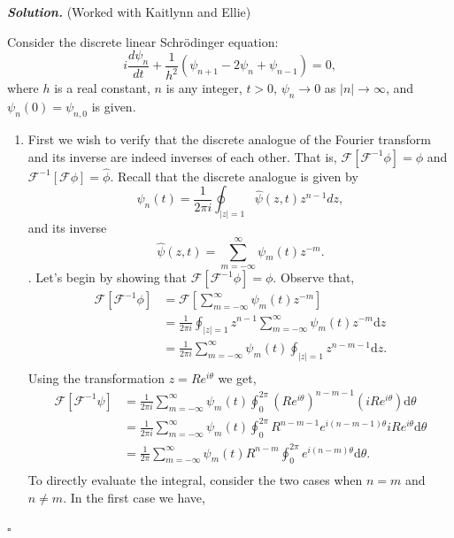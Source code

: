 \documentclass[12pt]{report}
\newenvironment{solution}[1][\it{Solution}]{\textbf{#1. } }{$\square$}
\begin{document}
\begin{solution}
    (Worked with Kaitlynn and Ellie)

    \noindent
     
    Consider the discrete linear Schr\"odinger equation:
    $$
    i\frac{d\psi_n}{dt}+\frac{1}{h^2}(\psi_{n+1}-2 \psi_n+\psi_{n-1})=0,
    $$
    where $h$ is a real constant, $n$ is any integer, $t>0$, $\psi_n\rightarrow 0$
    as $|n|\rightarrow \infty$, and $\psi_n(0)=\psi_{n,0}$ is given.

    \begin{enumerate}
        \item First we wish to verify that the discrete analogue of the Fourier transform and its inverse are indeed inverses of each other. That is, $\mathcal{F} [ \mathcal{F}^{-1} \phi] = \phi$ and $\mathcal{F}^{-1} [ \mathcal{F} \phi] = \hat{\phi}$. Recall that the discrete analogue is given by 
        \[
        \psi_n(t)=\frac{1}{2\pi i}\oint_{|z|=1} \hat{\psi}(z,t) z^{n-1} dz,
        \]
        and its inverse
        \[
        \hat{\psi}(z,t)=\sum_{m=-\infty}^\infty \psi_m(t) z^{-m}.
        \].
        Let's begin by showing that $\mathcal{F} [ \mathcal{F}^{-1} \phi] = \phi$. Observe that,
        \begin{align*}
            \mathcal{F} [ \mathcal{F}^{-1} \phi] &= \mathcal{F} \left[ \sum_{m=-\infty}^\infty \psi_m(t) z^{-m} \right]\\
            &=\frac{1}{2\pi i}\oint_{|z|=1}z^{n-1}\sum_{m=-\infty}^\infty\psi_m(t)z^{-m}\mathrm{d}z\\
            &=\frac{1}{2\pi i}\sum_{m=-\infty}^\infty\psi_m(t)\oint_{|z|=1}z^{n-m-1}\mathrm{d}z.\\
        \end{align*}
        Using the transformation $z = Re^{i\theta}$ we get,
        \begin{align*}
            \mathcal{F}[\mathcal{F}^{-1}\psi]&=\frac{1}{2\pi i}\sum_{m=-\infty}^\infty\psi_m(t)\oint_0^{2\pi}(Re^{i\theta})^{n-m-1}(iRe^{i\theta})\mathrm{d}\theta\\
            &=\frac{1}{2\pi i}\sum_{m=-\infty}^\infty\psi_m(t)\oint_0^{2\pi}R^{n-m-1}e^{i(n-m-1)\theta}iRe^{i\theta}\mathrm{d}\theta\\
            &=\frac{1}{2\pi}\sum_{m=-\infty}^\infty\psi_m(t)R^{n-m}\oint_0^{2\pi}e^{i(n-m)\theta}\mathrm{d}\theta.\\
        \end{align*}
        To directly evaluate the integral, consider the two cases when $n = m$ and $n \neq m$. In the first case we have,

\end{enumerate}
\end{solution}
\end{document}
